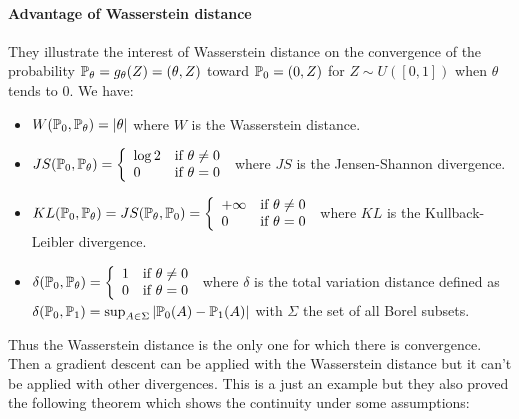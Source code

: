 \paragraph{Advantage of Wasserstein distance}
They illustrate the interest of Wasserstein distance on the convergence of the probability $\mathbb{P}_\theta = g_\theta(Z) = (\theta, Z)$ toward $\mathbb{P}_0 = (0, Z)$ for $Z \sim U([0, 1])$ when $\theta$ tends to 0. We have:
\begin{itemize}
	\item $W(\mathbb{P}_0, \mathbb{P}_\theta) = | \theta |$ where $W$ is the Wasserstein distance.
	\item $JS(\mathbb{P}_0, \mathbb{P}_\theta) = \left\{ \begin{array}{ll}
			\log 2 & \text{if } \theta \neq 0 \\
			0 & \text{if } \theta = 0
		\end{array} \right.$ where $JS$ is the Jensen-Shannon divergence.
	\item $KL(\mathbb{P}_0, \mathbb{P}_\theta) = JS(\mathbb{P}_\theta, \mathbb{P}_0) = \left\{ \begin{array}{ll}
			+ \infty & \text{if } \theta \neq 0 \\
			0 & \text{if } \theta = 0
		\end{array} \right.$ where $KL$ is the Kullback-Leibler divergence.
	\item $\delta(\mathbb{P}_0, \mathbb{P}_\theta) = \left\{ \begin{array}{ll}
			1 & \text{if } \theta \neq 0 \\
			0 & \text{if } \theta = 0
		\end{array} \right.$ where $\delta$ is the total variation distance defined as \\ $\delta(\mathbb{P}_0, \mathbb{P}_1) = \sup_{A \in \Sigma} | \mathbb{P}_0(A) - \mathbb{P}_1(A) |$ with $\Sigma$ the set of all Borel subsets.
\end{itemize}
Thus the Wasserstein distance is the only one for which there is convergence. Then a gradient descent can be applied with the Wasserstein distance but it can't be applied with other divergences. This is a just an example but they also proved the following theorem which shows the continuity under some assumptions:


